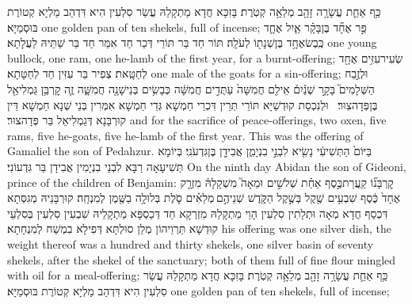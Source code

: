 {כַּ֥ף אַחַ֛ת עֲשָׂרָ֥ה זָהָ֖ב מְלֵאָ֥ה קְטֹֽרֶת׃}
{בָּזִכָּא חֲדָא מַתְקָלַהּ עֲשַׂר סִלְעִין הִיא דִּדְהַב מַלְיָא קְטוֹרֶת בּוּסְמַיָּא׃}
{one golden pan of ten shekels, full of incense;}{}
{פַּ֣ר אֶחָ֞ד בֶּן\maqqaf בָּקָ֗ר אַ֧יִל אֶחָ֛ד כֶּֽבֶשׂ\maqqaf אֶחָ֥ד בֶּן\maqqaf שְׁנָת֖וֹ לְעֹלָֽה׃}
{תּוֹר חַד בַּר תּוֹרֵי דְּכַר חַד אִמַּר חַד בַּר שַׁתֵּיהּ לַעֲלָתָא׃}
{one young bullock, one ram, one he-lamb of the first year, for a burnt-offering;}{}
{שְׂעִיר\maqqaf עִזִּ֥ים אֶחָ֖ד לְחַטָּֽאת׃}
{צְפִיר בַּר עִזִּין חַד לְחַטָּתָא׃}
{one male of the goats for a sin-offering;}{}
{וּלְזֶ֣בַח הַשְּׁלָמִים֮ בָּקָ֣ר שְׁנַ֒יִם֒ אֵילִ֤ם חֲמִשָּׁה֙ עַתֻּדִ֣ים חֲמִשָּׁ֔ה כְּבָשִׂ֥ים בְּנֵי\maqqaf שָׁנָ֖ה חֲמִשָּׁ֑ה זֶ֛ה קׇרְבַּ֥ן גַּמְלִיאֵ֖ל בֶּן\maqqaf פְּדָהצֽוּר׃ \petucha }
{וּלְנִכְסַת קוּדְשַׁיָּא תּוֹרֵי תְּרֵין דִּכְרֵי חַמְשָׁא גְּדֵי חַמְשָׁא אִמְּרִין בְּנֵי שְׁנָא חַמְשָׁא דֵּין קוּרְבָּנָא דְּגַמְלִיאֵל בַּר פְּדָהצוּר׃}
{and for the sacrifice of peace-offerings, two oxen, five rams, five he-goats, five he-lamb of the first year. This was the offering of Gamaliel the son of Pedahzur.}{}
{בַּיּוֹם֙ הַתְּשִׁיעִ֔י נָשִׂ֖יא לִבְנֵ֣י בִנְיָמִ֑ן אֲבִידָ֖ן בֶּן\maqqaf גִּדְעֹנִֽי׃}
{בְּיוֹמָא תְּשִׁיעָאָה רַבָּא לִבְנֵי בִנְיָמִין אֲבִידָן בַּר גִּדְעוֹנִי׃}
{On the ninth day Abidan the son of Gideoni, prince of the children of Benjamin:}{}
{קׇרְבָּנ֞וֹ קַֽעֲרַת\maqqaf כֶּ֣סֶף אַחַ֗ת שְׁלֹשִׁ֣ים וּמֵאָה֮ מִשְׁקָלָהּ֒ מִזְרָ֤ק אֶחָד֙ כֶּ֔סֶף שִׁבְעִ֥ים שֶׁ֖קֶל בְּשֶׁ֣קֶל הַקֹּ֑דֶשׁ שְׁנֵיהֶ֣ם \legarmeh  מְלֵאִ֗ים סֹ֛לֶת בְּלוּלָ֥ה בַשֶּׁ֖מֶן לְמִנְחָֽה׃}
{קוּרְבָּנֵיהּ מְגִסְּתָא דִּכְסַף חֲדָא מְאָה וּתְלָתִין סִלְעִין הָוֵי מַתְקָלַהּ מִזְרְקָא חַד דְּכַסְפָּא מַתְקָלֵיהּ שִׁבְעִין סִלְעִין בְּסִלְעֵי קוּדְשָׁא תַּרְוֵיהוֹן מְלַן סוּלְתָּא דְּפִילָא בִמְשַׁח לְמִנְחָתָא׃}
{his offering was one silver dish, the weight thereof was a hundred and thirty shekels, one silver basin of seventy shekels, after the shekel of the sanctuary; both of them full of fine flour mingled with oil for a meal-offering;}{}
{כַּ֥ף אַחַ֛ת עֲשָׂרָ֥ה זָהָ֖ב מְלֵאָ֥ה קְטֹֽרֶת׃}
{בָּזִכָּא חֲדָא מַתְקָלַהּ עֲשַׂר סִלְעִין הִיא דִּדְהַב מַלְיָא קְטוֹרֶת בּוּסְמַיָּא׃}
{one golden pan of ten shekels, full of incense;}{}
